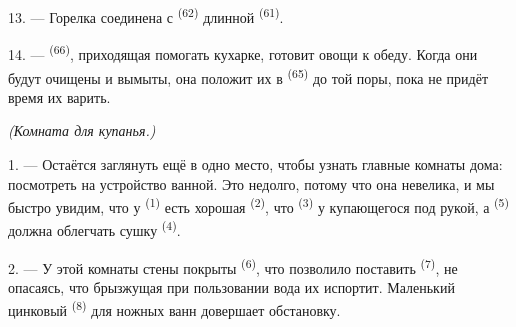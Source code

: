 13. --- Горелка соединена с  \textsuperscript{(62)}
длинной  \textsuperscript{(61)}.

14. ---  \textsuperscript{(66)}, приходящая помогать кухарке,
готовит овощи к обеду. Когда они будут очищены и вымыты, она положит их
в  \textsuperscript{(65)} до той поры, пока не придёт время их
варить.

\VUsaut{4.0mm}
{\centering\fontsize{10.2pt}{10.2pt}\selectfont{} \textit{(Комната для купанья.)}\par}
\VUsaut{3.0mm}

1. --- Остаётся заглянуть ещё в одно место, чтобы узнать главные комнаты
дома: посмотреть на устройство ванной. Это недолго, потому что она
невелика, и мы быстро увидим, что у  \textsuperscript{(1)} есть
хорошая  \textsuperscript{(2)}, что 
\textsuperscript{(3)} у купающегося под рукой, а 
\textsuperscript{(5)} должна облегчать сушку  \textsuperscript{(4)}.

2. --- У этой комнаты стены покрыты 
\textsuperscript{(6)}, что позволило поставить  \textsuperscript{(7)}, не
опасаясь, что брызжущая при пользовании вода их испортит. Маленький
цинковый  \textsuperscript{(8)} для ножных ванн довершает обстановку.
\VUsaut{6.0mm}
\VUfilet{22mm}
